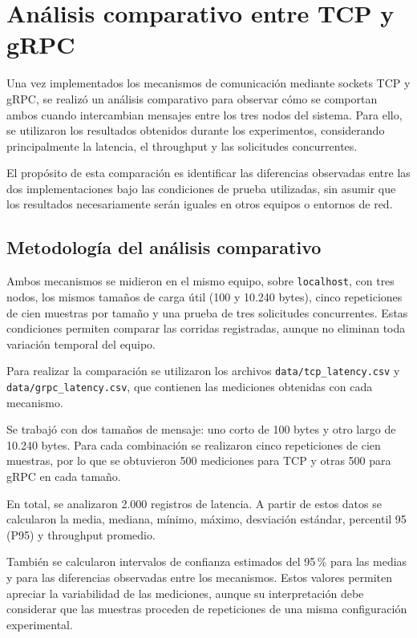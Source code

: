 
\section{Análisis comparativo entre TCP y gRPC}
\label{sec:comparacion-tcp-grpc}

Una vez implementados los mecanismos de comunicación mediante sockets TCP y
gRPC, se realizó un análisis comparativo para observar cómo se comportan
ambos cuando intercambian mensajes entre los tres nodos del sistema. Para
ello, se utilizaron los resultados obtenidos durante los experimentos,
considerando principalmente la latencia, el throughput y las solicitudes
concurrentes.

El propósito de esta comparación es identificar las diferencias observadas
entre las dos implementaciones bajo las condiciones de prueba utilizadas,
sin asumir que los resultados necesariamente serán iguales en otros equipos
o entornos de red.

\subsection{Metodología del análisis comparativo}

Ambos mecanismos se midieron en el mismo equipo, sobre \texttt{localhost},
con tres nodos, los mismos tamaños de carga útil (100 y 10.240 bytes), cinco
repeticiones de cien muestras por tamaño y una prueba de tres solicitudes
concurrentes. Estas condiciones permiten comparar las corridas registradas,
aunque no eliminan toda variación temporal del equipo.

Para realizar la comparación se utilizaron los archivos
\texttt{data/tcp\_latency.csv} y \texttt{data/grpc\_latency.csv}, que
contienen las mediciones obtenidas con cada mecanismo.

Se trabajó con dos tamaños de mensaje: uno corto de 100 bytes y otro largo
de 10.240 bytes. Para cada combinación se realizaron cinco repeticiones
de cien muestras, por lo que se obtuvieron 500 mediciones para TCP y
otras 500 para gRPC en cada tamaño.

En total, se analizaron 2.000 registros de latencia. A partir de estos
datos se calcularon la media, mediana, mínimo, máximo, desviación estándar,
percentil 95 (P95) y throughput promedio.

También se calcularon intervalos de confianza estimados del 95\,\% para
las medias y para las diferencias observadas entre los mecanismos. Estos
valores permiten apreciar la variabilidad de las mediciones, aunque su
interpretación debe considerar que las muestras proceden de repeticiones
de una misma configuración experimental.

